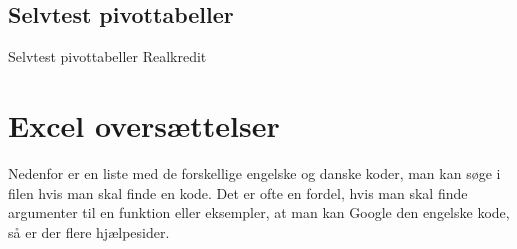 \documentclass[
]{book}
\begin{document}
\begin{embed-container}

\end{embed-container}

\hypertarget{selvtest-pivottabeller}{%
\section{Selvtest pivottabeller}\label{selvtest-pivottabeller}}

Selvtest pivottabeller Realkredit

\hypertarget{excel-oversuxe6ttelser}{%
\chapter{Excel oversættelser}\label{excel-oversuxe6ttelser}}

Nedenfor er en liste med de forskellige engelske og danske koder, man kan søge i filen hvis man skal finde en kode. Det er ofte en fordel, hvis man skal finde argumenter til en funktion eller eksempler, at man kan Google den engelske kode, så er der flere hjælpesider.
\end{document}
